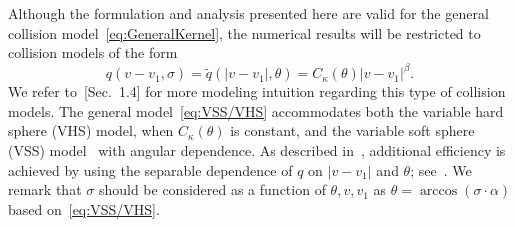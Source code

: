 \documentclass[12pt,nopreprintline]{elsarticle}
\begin{document}
Although the formulation and analysis presented here are valid for the general collision model~\eqref{eq:GeneralKernel}, the numerical results will be restricted to collision models of the form 
\begin{equation}\label{eq:VSS/VHS}
    q(v-v_1,\sigma) =  \tilde q(|v-v_1|,\theta) = C_\kappa(\theta) |v-v_1|^\beta.
\end{equation}
We refer to~[Sec.~1.4]\cite{villani2002review} for more modeling intuition regarding this type of collision models. The general model~\eqref{eq:VSS/VHS} accommodates both the variable hard sphere (VHS) model, when $C_\kappa(\theta)$ is constant, and the variable soft sphere (VSS) model~\cite[(4.10)]{gamba2017fast} with angular dependence. 
As described in~, additional efficiency is achieved by using the separable dependence of $q$ on $|v-v_1|$ and $\theta$; see~. We remark that $\sigma$ should be considered as a function of $\theta, v,v_1$ as $\theta = \arccos (\sigma \cdot \alpha)$ based on~\eqref{eq:VSS/VHS}.







\end{document}
